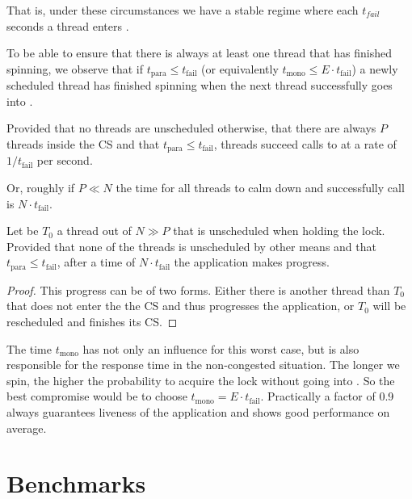 That is, under these circumstances we have a stable regime where each
$t_{fail}$ seconds a thread enters .

To be able to ensure that there is always at least one thread that
has finished spinning, we observe that if $t_{\textrm{para}} \leq
    t_{\textrm{fail}}$ (or equivalently $t_{\textrm{mono}} \leq E\cdot
    t_{\textrm{fail}}$) a newly scheduled thread has finished spinning
when the next thread successfully goes into .

\begin{lemma}
Provided that no threads are unscheduled otherwise, that there are
always $P$ threads inside the CS and that $t_{\textrm{para}} \leq
    t_{\textrm{fail}}$, threads succeed calls to  at a rate of
$1/t_{\textrm{fail}}$ per second.
\end{lemma}

Or, roughly if $P \ll N$ the time for all threads to calm down and
successfully call  is $N\cdot t_{\textrm{fail}}$.
\fi

\begin{theorem}
Let be $T_0$ a thread out of $N \gg P$ that is unscheduled when
holding the lock.  Provided that none of the threads is
unscheduled by other means and that $t_{\textrm{para}} \leq
    t_{\textrm{fail}}$, after a time of $N\cdot t_{\textrm{fail}}$ the
application makes progress.
\end{theorem}

\iflong
\begin{proof}
This progress can be of two forms.  Either there is another thread
than $T_{0}$ that does not enter the the CS and thus
progresses the application, or $T_0$ will be rescheduled and
finishes its CS.
\end{proof}

The time $t_{\textrm{mono}}$ has not only an influence for this
worst case, but is also responsible for the response time in the
non-congested situation. The longer we spin, the higher the
probability to acquire the lock without going into
. So the best compromise would be to choose
$t_{\textrm{mono}} = E\cdot t_{\textrm{fail}}$. Practically a
factor of 0.9 always guarantees liveness of the application and
shows good performance on average.
\fi

\section{Benchmarks}
\label{sec-4}

